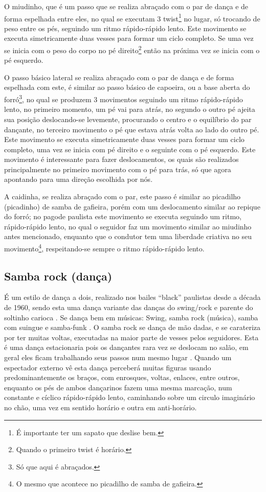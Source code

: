 O miudinho, que é um passo que se realiza abraçado com o par de dança e de forma espelhada entre eles,
no qual se executam 3 twist\footnote{É importante ter um sapato que deslise bem.} no lugar, 
só trocando de peso entre os pés, seguindo um ritmo rápido-rápido lento.
Este movimento se executa simetricamente duas vesses para formar um ciclo completo.  
Se uma vez se inicia com o peso do corpo no pé direito\footnote{Quando o primeiro twist é horário.} 
então na próxima vez se inicia com o pé esquerdo.

O passo básico lateral se realiza abraçado com o par de dança e de forma espelhada com este, 
é similar ao passo básico de capoeira,
ou a base aberta do forró\footnote{Só que aqui é abraçados.},
no qual se produzem 3 movimentos seguindo um ritmo rápido-rápido lento,
no primeiro momento, um pé vai para atrás, 
no segundo o outro pé ajeita sua posição deslocando-se levemente, 
procurando o centro e o equilíbrio do par dançante,
no terceiro movimento o pé que estava atrás volta ao lado do outro pé.
Este movimento se executa simetricamente duas vesses para formar um ciclo completo,  
uma vez se inicia com pé direito e o seguinte com o pé esquerdo.
Este movimento é interessante para fazer deslocamentos, 
os quais são realizados principalmente no primeiro movimento com o pé para trás, 
só que agora apontando para uma direção escolhida por nós.

A caidinha, se realiza abraçado com o par, 
este passo é similar ao picadilho (picadinho) de samba de gafieira,
porém com um deslocamento similar ao repique do forró;
no pagode paulista este movimento se executa seguindo um ritmo, rápido-rápido lento,
no qual o seguidor faz um movimento similar ao miudinho antes mencionado,
enquanto que o condutor tem uma liberdade criativa no 
seu movimento\footnote{O mesmo que acontece no picadilho de samba de gafieira.},  
respeitando-se sempre o ritmo rápido-rápido lento.

\subsection{Samba rock (dança)}
É um estilo de dança a dois, realizado nos bailes ``black'' paulistas desde a década de 1960, 
sendo esta uma dança variante das danças do swing/rock e parente do soltinho carioca \cite[pp. 135]{perna2002samba}.
Se dança bem em músicas: Swing, samba rock (música), samba com suingue e samba-funk \cite[pp. 135,138]{perna2002samba}.
O samba rock se dança de mão dadas, e se carateriza por ter muitas voltas,
executadas na maior parte de vesses pelos seguidores.
Esta é uma dança estacionaria pois os dançantes rara vez se deslocam no salão, 
em geral eles ficam trabalhando seus passos num mesmo lugar  \cite[pp. 135,138]{perna2002samba}.
Quando um espectador externo vê esta dança perceberá muitas figuras usando predominantemente os braços,
com enrosques, voltas, enlaces, entre outros,
enquanto os pés de ambos dançarinos fazem uma mesma marcação, num constante e cíclico rápido-rápido lento,
caminhando sobre um circulo imaginário no chão, uma vez em sentido horário e outra em anti-horário.

